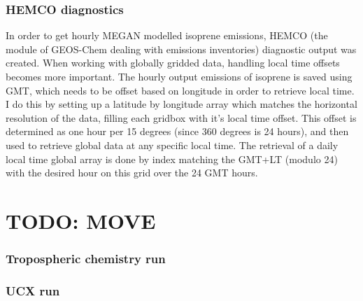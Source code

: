     \subsubsection{HEMCO diagnostics}
      
      In order to get hourly MEGAN modelled isoprene emissions, HEMCO (the module of GEOS-Chem dealing with emissions inventories) diagnostic output was created.
      When working with globally gridded data, handling local time offsets becomes more important.
      The hourly output emissions of isoprene is saved using GMT, which needs to be offset based on longitude in order to retrieve local time.
      I do this by setting up a latitude by longitude array which matches the horizontal resolution of the data, filling each gridbox with it's local time offset.
      This offset is determined as one hour per 15 degrees (since 360 degrees is 24 hours), and then used to retrieve global data at any specific local time.
      The retrieval of a daily local time global array is done by index matching the GMT+LT (modulo 24) with the desired hour on this grid over the 24 GMT hours.
    

  
  \section{TODO: MOVE}

  

      
      
      
    \subsubsection{Tropospheric chemistry run}
    
    \subsubsection{UCX run}
    

